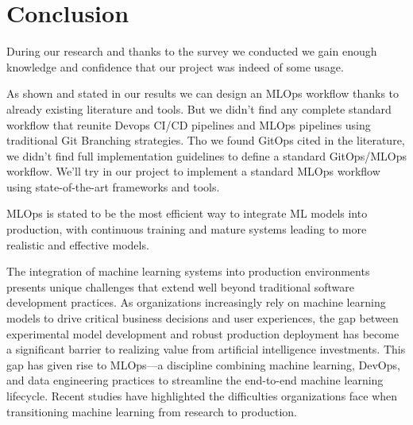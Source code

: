 \section{Conclusion}\label{sec:stconclusion}

During our research and thanks to the survey we conducted we gain enough knowledge and confidence that our project was indeed of some usage.

As shown and stated in our results we can design an MLOps workflow thanks to already existing literature and tools.
But we didn't find any complete standard workflow that reunite Devops CI/CD pipelines and MLOps pipelines using traditional Git Branching strategies.
Tho we found GitOps cited in the literature, we didn't find full implementation guidelines to define a standard GitOps/MLOps workflow.
We'll try in our project to implement a standard MLOps workflow using state-of-the-art frameworks and tools.

MLOps is stated to be the most efficient way to integrate ML models into production, with continuous training and mature systems leading to more realistic and effective models.\cite{inproceedings}


The integration of machine learning systems into production environments presents unique challenges that extend well beyond traditional software development practices.
As organizations increasingly rely on machine learning models to drive critical business decisions and user experiences,
the gap between experimental model development and robust production deployment has become a significant barrier to realizing value from artificial intelligence investments\cite{Haakman2021}.
This gap has given rise to MLOps—a discipline combining machine learning, DevOps, and data engineering practices to streamline the end-to-end machine learning lifecycle\cite{Kreuzberger2022MachineLO}.
Recent studies have highlighted the difficulties organizations face when transitioning machine learning from research to production.
